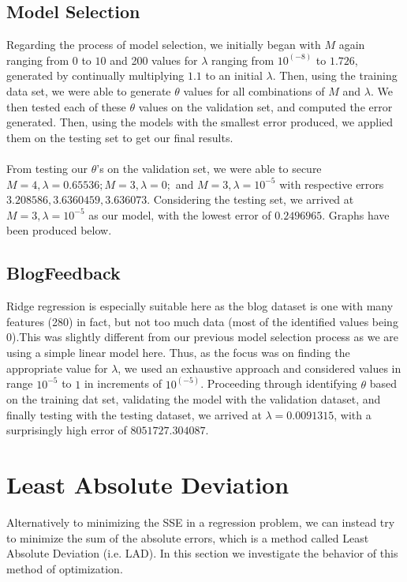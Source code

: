 \documentclass{article}
\begin{document}
\subsection{Model Selection}
Regarding the process of model selection, we initially began with $M$ again ranging from $0$ to $10$ and 200 values for $\lambda$ ranging from $10 ^ (-8)$ to $1.726$, generated by continually multiplying $1.1$ to an initial $\lambda$. Then, using the training data set, we were able to generate $\theta$ values for all combinations of $M$ and $\lambda$. We then tested each of these $\theta$ values on the validation set, and computed the error generated. Then, using the models with the smallest error produced, we applied them on the testing set to get our final results. \\ \\ 
From testing our $\theta$'s on the validation set, we were able to secure $M = 4, \lambda = 0.65536; M = 3, \lambda = 0;$ and $M = 3, \lambda = 10 ^ {-5}$ with respective errors $3.208586, 3.6360459, 3.636073$. Considering the testing set, we arrived at $M = 3, \lambda = 10 ^ {-5}$ as our model, with the lowest error of $0.2496965$. Graphs have been produced below.

\subsection{BlogFeedback}
Ridge regression is especially suitable here as the blog dataset is one with many features (280) in fact, but not too much data (most of the identified values being $0$).This was slightly different from our previous model selection process as we are using a simple linear model here. Thus, as the focus was on finding the appropriate value for $\lambda$, we used an exhaustive approach and considered values in range $10 ^ {-5}$ to $1$ in increments of $10 ^ (-5)$. Proceeding through identifying $\theta$ based on the training dat set, validating the model with the validation dataset, and finally testing with the testing dataset, we arrived at $\lambda = 0.0091315$, with a surprisingly high error of $8051727.304087$.

\section{Least Absolute Deviation}
Alternatively to minimizing the SSE in a regression problem, we can instead try to minimize the sum of the absolute errors, which is a method called Least Absolute Deviation (i.e. LAD). In this section we investigate the behavior of this method of optimization.
\end{document}
